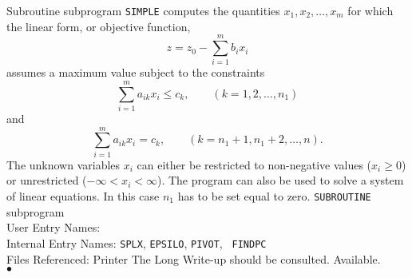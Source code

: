                            
                             
\Submitter{}                                
                         
Subroutine subprogram {\tt SIMPLE} computes the quantities
$x_1,x_2,\ldots,x_m$ for which the linear form, or objective function,
$$z = z_0 - \sum_{i=1}^m b_i x_i$$
assumes a maximum value subject to the constraints
$$ \sum ^m_{i=1} a_{ik}x_i \leq c_k,\qquad  (k = 1,2,\ldots,n_1)$$
and
$$ \sum^m_{i=1}a_{ik} x_i = c_k, \qquad (k = n_1+1,n_1+2,\ldots,n).$$
The unknown variables $x_i$ can either be restricted to non-negative
values ($x_i \ge 0$) or unrestricted ($-\infty <x_i<\infty$).
The program can also be used to solve a system of linear equations. In
this case $n_1$ has to be set equal to zero.
\Structure
{\tt SUBROUTINE} subprogram \\
User Entry Names: \\
Internal Entry Names: {\tt SPLX}, {\tt EPSILO}, {\tt PIVOT}, {\tt
FINDPC}\\
Files Referenced: Printer
\Usage
The Long Write-up should be consulted.
\Longwr
Available.
\\ $\bullet$
